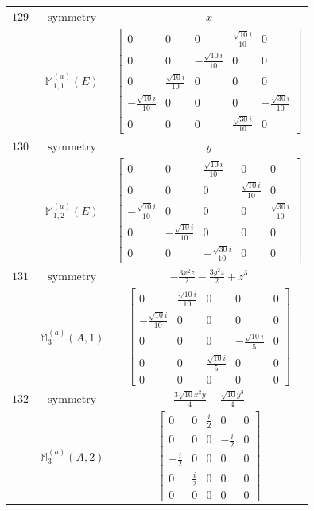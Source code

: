 \documentclass[fleqn,8pt,landscape]{jsarticle}
\begin{document}
\begin{longtable}{ccc}
$ 129 $ & $ \text{symmetry} $ & $ x $ \\
$  $ & $ \mathbb{M}_{1,1}^{(a)}(E) $ & $ \begin{bmatrix} 0 & 0 & 0 & \frac{\sqrt{10} i}{10} & 0 \\ 0 & 0 & - \frac{\sqrt{10} i}{10} & 0 & 0 \\ 0 & \frac{\sqrt{10} i}{10} & 0 & 0 & 0 \\ - \frac{\sqrt{10} i}{10} & 0 & 0 & 0 & - \frac{\sqrt{30} i}{10} \\ 0 & 0 & 0 & \frac{\sqrt{30} i}{10} & 0 \end{bmatrix} $ \\ \hline
$ 130 $ & $ \text{symmetry} $ & $ y $ \\
$  $ & $ \mathbb{M}_{1,2}^{(a)}(E) $ & $ \begin{bmatrix} 0 & 0 & \frac{\sqrt{10} i}{10} & 0 & 0 \\ 0 & 0 & 0 & \frac{\sqrt{10} i}{10} & 0 \\ - \frac{\sqrt{10} i}{10} & 0 & 0 & 0 & \frac{\sqrt{30} i}{10} \\ 0 & - \frac{\sqrt{10} i}{10} & 0 & 0 & 0 \\ 0 & 0 & - \frac{\sqrt{30} i}{10} & 0 & 0 \end{bmatrix} $ \\ \hline
$ 131 $ & $ \text{symmetry} $ & $ - \frac{3 x^{2} z}{2} - \frac{3 y^{2} z}{2} + z^{3} $ \\
$  $ & $ \mathbb{M}_{3}^{(a)}(A,1) $ & $ \begin{bmatrix} 0 & \frac{\sqrt{10} i}{10} & 0 & 0 & 0 \\ - \frac{\sqrt{10} i}{10} & 0 & 0 & 0 & 0 \\ 0 & 0 & 0 & - \frac{\sqrt{10} i}{5} & 0 \\ 0 & 0 & \frac{\sqrt{10} i}{5} & 0 & 0 \\ 0 & 0 & 0 & 0 & 0 \end{bmatrix} $ \\ \hline
$ 132 $ & $ \text{symmetry} $ & $ \frac{3 \sqrt{10} x^{2} y}{4} - \frac{\sqrt{10} y^{3}}{4} $ \\
$  $ & $ \mathbb{M}_{3}^{(a)}(A,2) $ & $ \begin{bmatrix} 0 & 0 & \frac{i}{2} & 0 & 0 \\ 0 & 0 & 0 & - \frac{i}{2} & 0 \\ - \frac{i}{2} & 0 & 0 & 0 & 0 \\ 0 & \frac{i}{2} & 0 & 0 & 0 \\ 0 & 0 & 0 & 0 & 0 \end{bmatrix} $ \\ \hline

\end{longtable}
\end{document}
